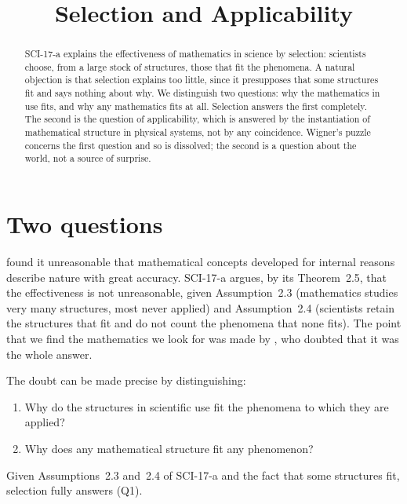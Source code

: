 \documentclass{situationist-preprint}
\title{Selection and Applicability}
\begin{document}
\maketitle

\begin{abstract}
SCI-17-a explains the effectiveness of mathematics in science by selection: scientists choose, from a large stock of structures, those that fit the phenomena. A natural objection is that selection explains too little, since it presupposes that some structures fit and says nothing about why. We distinguish two questions: why the mathematics in use fits, and why any mathematics fits at all. Selection answers the first completely. The second is the question of applicability, which is answered by the instantiation of mathematical structure in physical systems, not by any coincidence. Wigner's puzzle concerns the first question and so is dissolved; the second is a question about the world, not a source of surprise.
\end{abstract}

\section{Two questions}

\citet{Wigner1960} found it unreasonable that mathematical concepts developed for internal reasons describe nature with great accuracy. SCI-17-a argues, by its Theorem~2.5, that the effectiveness is not unreasonable, given Assumption~2.3 (mathematics studies very many structures, most never applied) and Assumption~2.4 (scientists retain the structures that fit and do not count the phenomena that none fits). The point that we find the mathematics we look for was made by \citet{Hamming1980}, who doubted that it was the whole answer.

The doubt can be made precise by distinguishing:
\begin{enumerate}
\item[(Q1)] Why do the structures in scientific use fit the phenomena to which they are applied?
\item[(Q2)] Why does any mathematical structure fit any phenomenon?
\end{enumerate}

\begin{proposition}\label{p:q1}
Given Assumptions~2.3 and~2.4 of SCI-17-a and the fact that some structures fit, selection fully answers (Q1).
\end{proposition}
\end{document}
